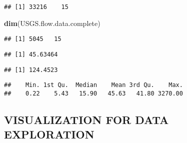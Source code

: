 \documentclass[]{article}
\newenvironment{Shaded}{\begin{snugshade}}{\end{snugshade}}
\newcommand{\KeywordTok}[1]{\textcolor[rgb]{0.13,0.29,0.53}{\textbf{#1}}}
\newcommand{\CommentTok}[1]{\textcolor[rgb]{0.56,0.35,0.01}{\textit{#1}}}
\newcommand{\OperatorTok}[1]{\textcolor[rgb]{0.81,0.36,0.00}{\textbf{#1}}}
\newcommand{\NormalTok}[1]{#1}
\begin{document}
\begin{verbatim}
## [1] 33216    15
\end{verbatim}

\begin{Shaded}
\begin{Highlighting}[]
\KeywordTok{dim}\NormalTok{(USGS.flow.data.complete)}
\end{Highlighting}
\end{Shaded}

\begin{verbatim}
## [1] 5045   15
\end{verbatim}

\begin{Shaded}
\end{Shaded}

\begin{verbatim}
## [1] 45.63464
\end{verbatim}

\begin{Shaded}
\end{Shaded}

\begin{verbatim}
## [1] 124.4523
\end{verbatim}

\begin{Shaded}
\end{Shaded}

\begin{verbatim}
##    Min. 1st Qu.  Median    Mean 3rd Qu.    Max. 
##    0.22    5.43   15.90   45.63   41.80 3270.00
\end{verbatim}

\subsection{VISUALIZATION FOR DATA
EXPLORATION}\label{visualization-for-data-exploration}
\end{document}

